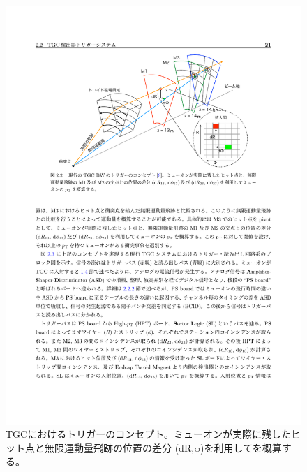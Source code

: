 \begin{figure} 
\centering
\includegraphics[width=16cm]{fig/Intro/TGC_triggerconcept.pdf}
\caption[TGCにおけるトリガーのコンセプト]{TGCにおけるトリガーのコンセプト\cite{mt_akatsuka}。ミューオンが実際に残したヒット点と無限運動量飛跡の位置の差分 ($\mathrm{dR}$,$\mathrm{\phi}$)を利用して\pt を概算する。}
\label{TGC_triggerconcept}
\end{figure}

